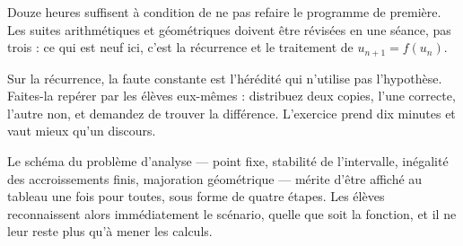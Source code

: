 \begin{notepourlaclasse}
Douze heures suffisent à condition de ne pas refaire le programme de
première. Les suites arithmétiques et géométriques doivent être révisées en
une séance, pas trois : ce qui est neuf ici, c'est la récurrence et le
traitement de $u_{n+1} = f(u_{n})$.

Sur la récurrence, la faute constante est l'hérédité qui n'utilise pas
l'hypothèse. Faites-la repérer par les élèves eux-mêmes : distribuez deux
copies, l'une correcte, l'autre non, et demandez de trouver la différence.
L'exercice prend dix minutes et vaut mieux qu'un discours.

Le schéma du problème d'analyse — point fixe, stabilité de l'intervalle,
inégalité des accroissements finis, majoration géométrique — mérite d'être
affiché au tableau une fois pour toutes, sous forme de quatre étapes. Les
élèves reconnaissent alors immédiatement le scénario, quelle que soit la
fonction, et il ne leur reste plus qu'à mener les calculs.
\end{notepourlaclasse}

